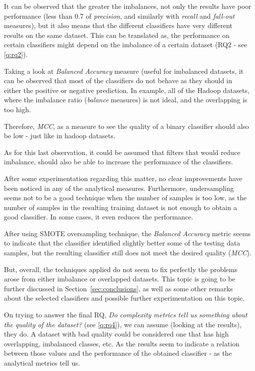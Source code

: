 It can be observed that the greater the imbalances, not only the results have 
poor performance (less than 0.7 of \textit{precision}, and similarly with 
\textit{recall} and \textit{fall-out} measures), but it also means that the 
different classifiers have very different results on the same dataset. This can 
be translated as, the performance on certain classifiers might depend on the 
imbalance of a certain dataset (RQ2 - see \ref{q:rq2}).

Taking a look at \textit{Balanced Accuracy} measure (useful for imbalanced 
datasets, it can be observed that most of the classifiers do not behave as 
they should in either the positive or negative prediction. In example, all of 
the Hadoop datasets, where the imbalance ratio (\textit{balance} measures) is 
not ideal, and the overlapping is too high. 

Therefore, \textit{MCC}, as a measure to see the quality of a binary classifier 
should also be low - just like in hadoop datasets.

As for this last observation, it could be assumed that filters that would reduce
imbalance, should also be able to increase the performance of the classifiers.

After some experimentation regarding this matter, no clear improvements have 
been noticed in any of the analytical measures. Furthermore, undersampling 
seems not to be a good technique when the number of samples is too low, as the 
number of samples in the resulting training dataset is not enough to obtain a 
good classifier. In some cases, it even reduces the performance.

After using SMOTE oversampling technique, the \textit{Balanced Accuracy} metric 
seems to indicate that the classifier identified slightly better some of the 
testing data samples, but the resulting classifier still does not meet the 
desired quality (\textit{MCC}).

But, overall, the techniques applied do not seem to fix perfectly the problems 
arose from either imbalance or overlapped datasets. This topic is going to be 
further discussed in Section~\ref{sec:conclusions}, as well as some other 
remarks about the selected classifiers and possible further experimentation on
this topic.

On trying to answer the final RQ, \textit{Do complexity metrics tell us 
something about the quality of the dataset?} (see \ref{q:rq4}), we can assume 
(looking at the results), they do. A dataset with bad quality could be 
considered one that has high overlapping, imbalanced classes, etc. As the 
results seem to indicate a relation between those values and the performance of 
the obtained classifier - as the analytical metrics tell us.

\lhead{}




